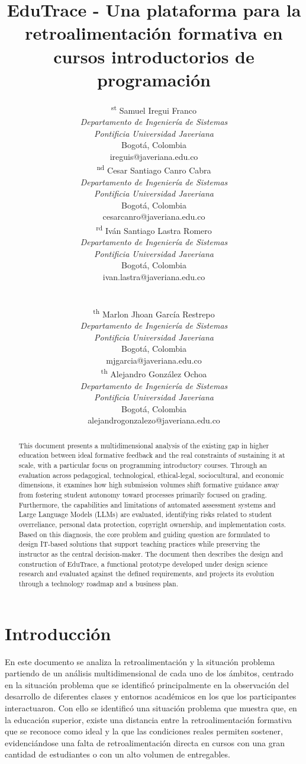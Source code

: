 \documentclass[letterpaper, 10 pt, conference]{ieeeconf}
\title{\LARGE \bf
EduTrace - Una plataforma para la retroalimentación formativa en cursos introductorios de programación
}
\author{
	\parbox{2.0 in}{\centering 1\textsuperscript{st} Samuel Iregui Franco\\
		\footnotesize\textit{Departamento de Ingeniería de Sistemas}\\
		\footnotesize\textit{Pontificia Universidad Javeriana}\\
		 Bogotá, Colombia\\
		{\footnotesize ireguis@javeriana.edu.co}}
	\hspace*{0.1 in}
	\parbox{2.0 in}{\centering 2\textsuperscript{nd} Cesar Santiago Canro Cabra\\
		\footnotesize\textit{Departamento de Ingeniería de Sistemas}\\
		\footnotesize\textit{Pontificia Universidad Javeriana}\\
		\footnotesize Bogotá, Colombia\\
		{\footnotesize cesarcanro@javeriana.edu.co}}
	\hspace*{0.1 in}
	\parbox{2.1 in}{\centering 3\textsuperscript{rd} Iván Santiago Lastra Romero\\
		\footnotesize\textit{Departamento de Ingeniería de Sistemas}\\
		\footnotesize\textit{Pontificia Universidad Javeriana}\\
		Bogotá, Colombia\\
		{\footnotesize ivan.lastra@javeriana.edu.co}}
	\hspace*{0.1 in}
	\\[0.2 in] %
	\parbox{2.2 in}{\centering 4\textsuperscript{th} Marlon Jhoan García Restrepo\\
		\footnotesize\textit{Departamento de Ingeniería de Sistemas}\\
		\footnotesize\textit{Pontificia Universidad Javeriana}\\
		Bogotá, Colombia\\
		{\footnotesize mjgarcia@javeriana.edu.co}}
	\hspace*{0.2 in}
	\parbox{2.0 in}{\centering 5\textsuperscript{th} Alejandro González Ochoa\\
		\footnotesize\textit{Departamento de Ingeniería de Sistemas}\\
		\footnotesize\textit{Pontificia Universidad Javeriana}\\
		Bogotá, Colombia\\
		{\footnotesize alejandrogonzalezo@javeriana.edu.co}}
	\hspace*{0.2 in}
}
\begin{document}
	
\maketitle


\begin{abstract}
	This document presents a multidimensional analysis of the existing gap in higher education between ideal formative feedback and the real constraints of sustaining it at scale, with a particular focus on programming introductory courses. Through an evaluation across pedagogical, technological, ethical-legal, sociocultural, and economic dimensions, it examines how high submission volumes shift formative guidance away from fostering student autonomy toward processes primarily focused on grading. Furthermore, the capabilities and limitations of automated assessment systems and Large Language Models (LLMs) are evaluated, identifying risks related to student overreliance, personal data protection, copyright ownership, and implementation costs. Based on this diagnosis, the core problem and guiding question are formulated to design IT-based solutions that support teaching practices while preserving the instructor as the central decision-maker. The document then describes the design and construction of EduTrace, a functional prototype developed under design science research and evaluated against the defined requirements, and projects its evolution through a technology roadmap and a business plan.
\end{abstract}

\section{Introducción} 

En este documento se analiza la retroalimentación y la situación problema partiendo de un análisis multidimensional de cada uno de los ámbitos, centrado en la situación problema que se identificó principalmente en la observación del desarrollo de diferentes clases y entornos académicos en los que los participantes interactuaron. Con ello se identificó una situación problema que muestra que, en la educación superior, existe una distancia entre la retroalimentación formativa que se reconoce como ideal y la que las condiciones reales permiten sostener, evidenciándose una falta de retroalimentación directa en cursos con una gran cantidad de estudiantes o con un alto volumen de entregables.
\end{document}
